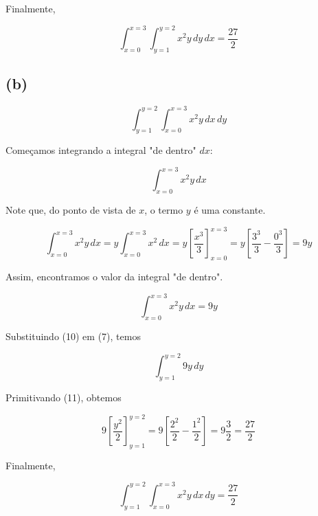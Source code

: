 Finalmente,

\[ \boxed{\int_{x=0}^{x=3} \int_{y=1}^{y=2} x^2y \, dy \, dx = \frac{27}{2}}  \]

\subsection*{(b)}

\begin{equation}
    \int_{y=1}^{y=2} \int_{x=0}^{x=3} x^2y \, dx \, dy
\end{equation}

Começamos integrando a integral "de dentro" $dx$:

\begin{equation}
    \int_{x=0}^{x=3} x^2y \, dx
\end{equation}

Note que, do ponto de vista de $x$, o termo $y$ é uma constante.

\begin{equation}
    \int_{x=0}^{x=3} x^2y \, dx =
    y\int_{x=0}^{x=3} x^2 \, dx =
    y \left[\frac{x^3}{3}\right]_{x=0}^{x=3} =
    y \left[\frac{3^3}{3} - \frac{0^3}{3}\right] =
    9y
\end{equation}

Assim, encontramos o valor da integral "de dentro".

\begin{equation}
    \int_{x=0}^{x=3} x^2y \, dx = 9y
\end{equation}

Substituindo (10) em (7), temos

\begin{equation}
    \int_{y=1}^{y=2} 9y \, dy
\end{equation}

Primitivando (11), obtemos

\begin{equation}
    9 \left[\frac{y^2}{2}\right]_{y=1}^{y=2} = 
    9 \left[\frac{2^2}{2} - \frac{1^2}{2}\right] = 
    9 \frac{3}{2} = \frac{27}{2}
\end{equation}

Finalmente,

\[ \boxed{\int_{y=1}^{y=2} \int_{x=0}^{x=3} x^2y \, dx \, dy = \frac{27}{2}}  \]




